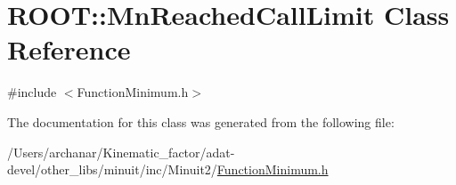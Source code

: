 \hypertarget{classROOT_1_1Minuit2_1_1FunctionMinimum_1_1MnReachedCallLimit}{}\section{R\+O\+OT\+:\+:Mn\+Reached\+Call\+Limit Class Reference}
\label{classROOT_1_1Minuit2_1_1FunctionMinimum_1_1MnReachedCallLimit}


{\ttfamily \#include $<$Function\+Minimum.\+h$>$}



The documentation for this class was generated from the following file\+:\begin{DoxyCompactItemize}
\item 
/\+Users/archanar/\+Kinematic\+\_\+factor/adat-\/devel/other\+\_\+libs/minuit/inc/\+Minuit2/\mbox{\hyperlink{adat-devel_2other__libs_2minuit_2inc_2Minuit2_2FunctionMinimum_8h}{Function\+Minimum.\+h}}\end{DoxyCompactItemize}
